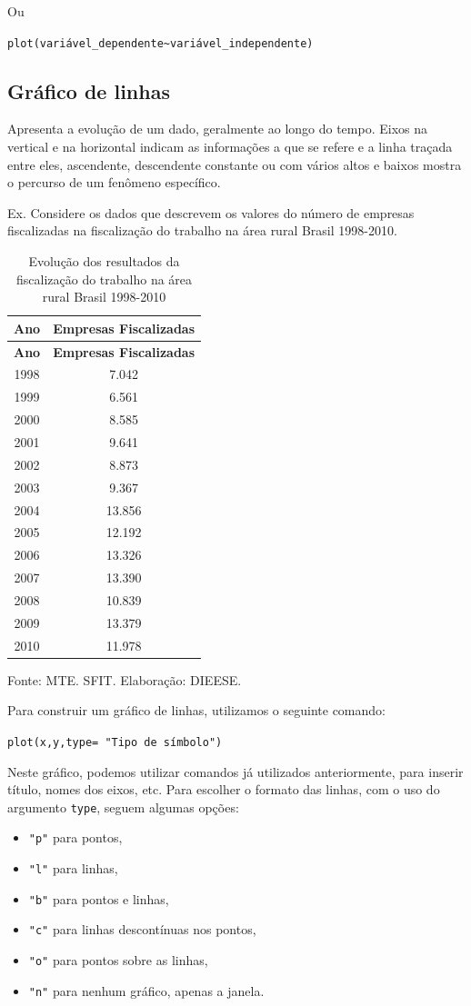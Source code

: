 \documentclass[12pt,brazil,oneside]{book}
\providecommand{\tightlist}{%
  \setlength{\itemsep}{0pt}\setlength{\parskip}{0pt}}
\begin{document}
Ou

\texttt{plot(variável\_dependente\textasciitilde{}variável\_independente)}

\hypertarget{grafico-de-linhas}{%
\subsection{Gráfico de linhas}\label{grafico-de-linhas}}

Apresenta a evolução de um dado, geralmente ao longo do tempo. Eixos na vertical e na horizontal indicam as informações a que se refere e a linha traçada entre eles, ascendente, descendente constante ou com vários altos e baixos mostra o percurso de um fenômeno específico.

Ex. Considere os dados que descrevem os valores do número de empresas fiscalizadas na fiscalização do trabalho na área rural Brasil 1998-2010.

\begin{longtable}[]{@{}cc@{}}
\caption{\label{tab:evolres}Evolução dos resultados da fiscalização do trabalho na área rural Brasil 1998-2010}\tabularnewline
\toprule
\textbf{Ano} & \textbf{Empresas Fiscalizadas}\tabularnewline
\midrule
\endfirsthead
\toprule
\textbf{Ano} & \textbf{Empresas Fiscalizadas}\tabularnewline
\midrule
\endhead
1998 & 7.042\tabularnewline
1999 & 6.561\tabularnewline
2000 & 8.585\tabularnewline
2001 & 9.641\tabularnewline
2002 & 8.873\tabularnewline
2003 & 9.367\tabularnewline
2004 & 13.856\tabularnewline
2005 & 12.192\tabularnewline
2006 & 13.326\tabularnewline
2007 & 13.390\tabularnewline
2008 & 10.839\tabularnewline
2009 & 13.379\tabularnewline
2010 & 11.978\tabularnewline
\bottomrule
\end{longtable}

Fonte: MTE. SFIT. Elaboração: DIEESE.

Para construir um gráfico de linhas, utilizamos o seguinte comando:

\texttt{plot(x,y,type=\ "Tipo\ de\ símbolo")}

Neste gráfico, podemos utilizar comandos já utilizados anteriormente, para inserir título, nomes dos eixos, etc. Para escolher o formato das linhas, com o uso do argumento \texttt{type}, seguem algumas opções:

\begin{itemize}
\tightlist
\item
  \texttt{"p"} para pontos,
\item
  \texttt{"l"} para linhas,
\item
  \texttt{"b"} para pontos e linhas,
\item
  \texttt{"c"} para linhas descontínuas nos pontos,
\item
  \texttt{"o"} para pontos sobre as linhas,
\item
  \texttt{"n"} para nenhum gráfico, apenas a janela.
\end{itemize}
\end{document}
